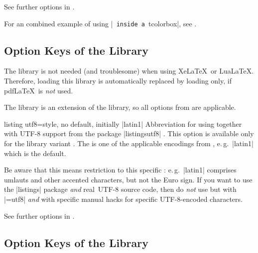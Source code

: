 See further options in .

\begin{marker}
For an combined example of using |\lstinline| inside a |tcolorbox|, see
.
\end{marker}

\clearpage
\subsection{Option Keys of the  Library}
\begin{marker}
The  library is not needed (and troublesome) when using Xe\LaTeX\ or Lua\LaTeX.
Therefore, loading this library is automatically replaced by loading
 only, if pdf\LaTeX\ is \emph{not} used.
\end{marker}

The  library is an extension of the
 library, so
all options from  are applicable.

\begin{docTcbKey}{listing utf8}{=}{style, no default, initially |latin1|}
  Abbreviation for using 
  together with UTF-8 support from the package |listingsutf8| \cite{oberdiek:listingsutf8}.
  This option is available only for the library variant .
  The  is one of
  the applicable encodings from \cite{oberdiek:listingsutf8}, e.\,g.\ |latin1|
  which is the default.\par
  Be aware that this means restriction to this specific :
  e.\,g.\ |latin1| comprises umlauts and other accented characters, but not
  the Euro sign. If you want to use the |listings| package \emph{and} \flqq real\frqq\
  UTF-8 source code, then do \emph{not} use  but 
  with
  |=utf8|
  \emph{and} with specific manual hacks for specific UTF-8-encoded characters.

\end{docTcbKey}

See further options in .

\clearpage
\subsection{Option Keys of the  Library}

